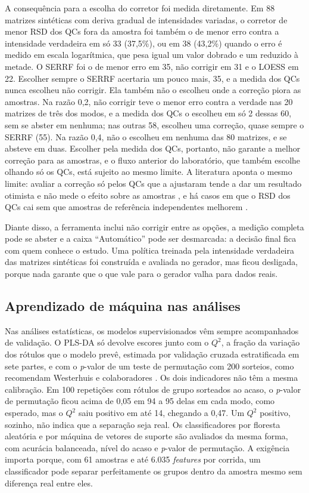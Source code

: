 A consequência para a escolha do corretor foi medida diretamente. Em 88 matrizes sintéticas com deriva gradual de intensidades variadas, o corretor de menor RSD dos QCs fora da amostra foi também o de menor erro contra a intensidade verdadeira em só 33 (37,5\%), ou em 38 (43,2\%) quando o erro é medido em escala logarítmica, que pesa igual um valor dobrado e um reduzido à metade. O SERRF foi o de menor erro em 35, não corrigir em 31 e o LOESS em 22. Escolher sempre o SERRF acertaria um pouco mais, 35, e a medida dos QCs nunca escolheu não corrigir. Ela também não o escolheu onde a correção piora as amostras. Na razão 0,2, não corrigir teve o menor erro contra a verdade nas 20 matrizes de três dos modos, e a medida dos QCs o escolheu em só 2 dessas 60, sem se abster em nenhuma; nas outras 58, escolheu uma correção, quase sempre o SERRF (55). Na razão 0,4, não o escolheu em nenhuma das 80 matrizes, e se absteve em duas. Escolher pela medida dos QCs, portanto, não garante a melhor correção para as amostras, e o fluxo anterior do laboratório, que também escolhe olhando só os QCs, está sujeito ao mesmo limite. A literatura aponta o mesmo limite: avaliar a correção só pelos QCs que a ajustaram tende a dar um resultado otimista e não mede o efeito sobre as amostras \cite{martens2023instrumental}, e há casos em que o RSD dos QCs cai sem que amostras de referência independentes melhorem \cite{brunius2016large}.

Diante disso, a ferramenta inclui não corrigir entre as opções, a medição completa pode se abster e a caixa ``Automático'' pode ser desmarcada: a decisão final fica com quem conhece o estudo. Uma política treinada pela intensidade verdadeira das matrizes sintéticas foi construída e avaliada no gerador, mas ficou desligada, porque nada garante que o que vale para o gerador valha para dados reais.

\subsection{Aprendizado de máquina nas análises}

Nas análises estatísticas, os modelos supervisionados vêm sempre acompanhados de validação. O PLS-DA só devolve escores junto com o \(Q^2\), a fração da variação dos rótulos que o modelo prevê, estimada por validação cruzada estratificada em sete partes, e com o \emph{p}-valor de um teste de permutação com 200 sorteios, como recomendam Westerhuis e colaboradores \cite{westerhuis2008assessment}. Os dois indicadores não têm a mesma calibração. Em 100 repetições com rótulos de grupo sorteados ao acaso, o \emph{p}-valor de permutação ficou acima de 0,05 em 94 a 95 delas em cada modo, como esperado, mas o \(Q^2\) saiu positivo em até 14, chegando a 0,47. Um \(Q^2\) positivo, sozinho, não indica que a separação seja real. Os classificadores por floresta aleatória e por máquina de vetores de suporte são avaliados da mesma forma, com acurácia balanceada, nível do acaso e \emph{p}-valor de permutação. A exigência importa porque, com 61 amostras e até 6.035 \emph{features} por corrida, um classificador pode separar perfeitamente os grupos dentro da amostra mesmo sem diferença real entre eles.

